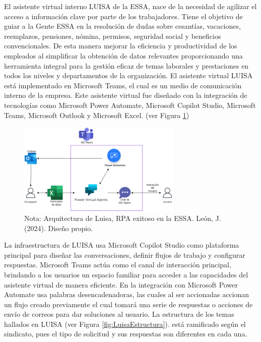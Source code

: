 \documentclass[letter,oneside,12pt,spanish]{report}
\begin{document}
\noindent El asistente virtual interno LUISA de la ESSA, nace de la necesidad de agilizar el acceso a información clave por parte de los trabajadores. Tiene el objetivo de guiar a la Gente ESSA en la resolución de dudas sobre cesantías, vacaciones, reemplazos, pensiones, nómina, permisos, seguridad social y beneficios convencionales. De esta manera mejorar la eficiencia y productividad de los empleados al simplificar la obtención de datos relevantes proporcionando una herramienta integral para la gestión eficaz de temas laborales y prestaciones en todos los niveles y departamentos de la organización. El asistente virtual LUISA está implementado en Microsoft Teams, el cual es un medio de comunicación interno de la empresa. Este asistente virtual fue diseñado con la integración de tecnologías como Microsoft Power Automate, Microsoft Copilot Studio, Microsoft Teams, Microsoft Outlook y Microsoft Excel. (ver Figura \ref{fig:LuisaArquitectura})

\begin{figure}[ht]
    \centering
    \includegraphics[width=0.7\textwidth]{Figs/arquitectura luisa.png}
    \label{fig:LuisaArquitectura}
    \\Nota: Arquitectura de Luisa, RPA exitoso en la ESSA. León, J. (2024). Diseño propio.
\end{figure}


\noindent La infraestructura de LUISA usa Microsoft Copilot Studio como plataforma principal para diseñar las conversaciones, definir flujos de trabajo y configurar respuestas. Microsoft Teams actúa como el canal de interacción principal, brindando a los usuarios un espacio familiar para acceder a las capacidades del asistente virtual de manera eficiente. En la integración con Microsoft Power Automate usa palabras desencadenadoras, las cuales al ser accionadas accionan un flujo creado previamente el cual tomará una serie de respuestas o acciones de envío de correos para dar soluciones al usuario. La estructura de los temas hallados en LUISA (ver Figura \ref{fig:LuisaEstructura}). está ramificado según el sindicato, pues el tipo de solicitud y sus respuestas son diferentes en cada una. 
\end{document}
